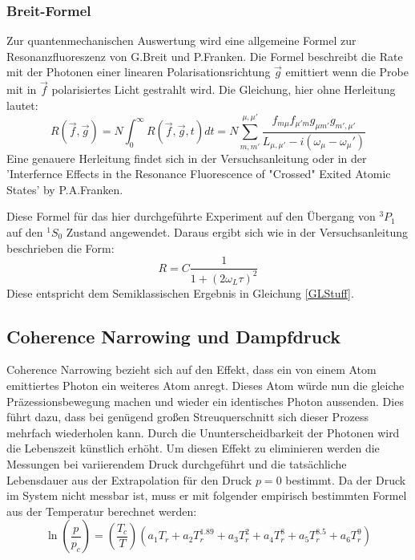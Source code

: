 \subsubsection{Breit-Formel}
Zur quantenmechanischen Auswertung wird eine allgemeine Formel zur Resonanzfluoreszenz von G.Breit und P.Franken. Die Formel beschreibt die Rate mit der Photonen einer linearen Polarisationsrichtung $\vec{g}$ emittiert wenn die Probe mit in $\vec{f}$ polarisiertes Licht gestrahlt wird. Die Gleichung, hier ohne Herleitung lautet:
\begin{equation}
	R(\vec{f},\vec{g})=N\int_{0}^{\infty}R(\vec{f},\vec{g},t)dt=N\sum_{m,m'}^{\mu,\mu'}\frac{f_{m\mu}f_{\mu'm}g_{\mu m'}g_{m',\mu'}}{L_{\mu,\mu'}-i(\omega_\mu -\omega_\mu')}
\end{equation}
Eine genauere Herleitung findet sich in der Versuchsanleitung\cite{Anleitung} oder in der 'Interfernce Effects in the Resonance Fluorescence of "Crossed" Exited Atomic States' by P.A.Franken. \par
Diese Formel für das hier durchgeführte Experiment auf den Übergang von $^3P_1$ auf den $^1S_0$ Zustand angewendet. Daraus ergibt sich wie in der Versuchsanleitung \cite{Anleitung} beschrieben die Form:
\begin{equation}
R=C\frac{1}{1+(2\omega_L\tau)^2}
\end{equation}
Diese entspricht dem Semiklassischen Ergebnis in Gleichung \ref{GLStuff}.
\subsection{Coherence Narrowing und Dampfdruck}
Coherence Narrowing bezieht sich auf den Effekt, dass ein von einem Atom emittiertes Photon ein weiteres Atom anregt. Dieses Atom würde nun die gleiche Präzessionsbewegung machen und wieder ein identisches Photon aussenden. Dies führt dazu, dass bei genügend großen Streuquerschnitt sich dieser Prozess mehrfach wiederholen kann. Durch die Ununterscheidbarkeit der Photonen wird die Lebenszeit künstlich erhöht. Um diesen Effekt zu eliminieren werden die Messungen bei variierendem Druck durchgeführt und die tatsächliche Lebensdauer aus der Extrapolation für den Druck $p = 0$ bestimmt. Da der Druck im System nicht messbar ist, muss er mit folgender empirisch bestimmten Formel aus
der Temperatur berechnet werden: 
\begin{equation}
	\ln(\frac{p}{p_c})=(\frac{T_c}{T})(a_1T_r+a_2T_r^{1.89}+a_3T_r^2+a_4T_r^8+a_5T_r^{8.5}+a_6T_r^9)
\end{equation}

